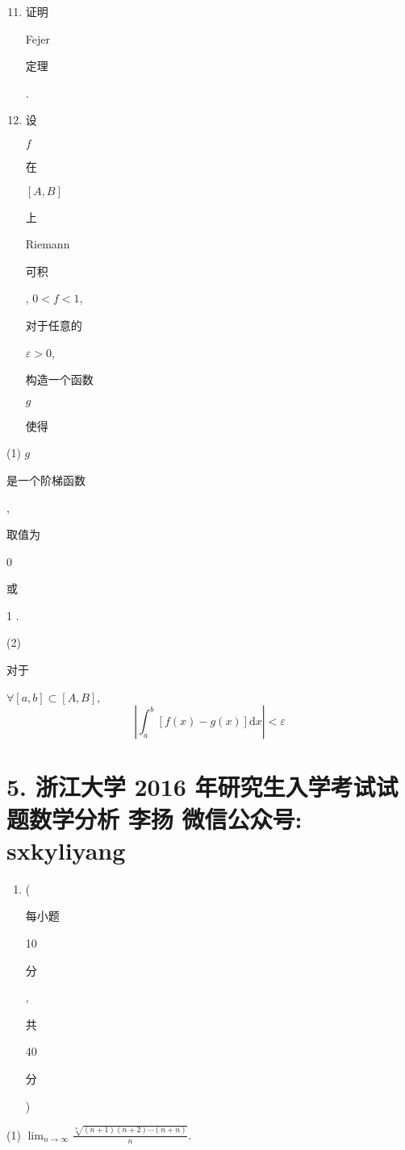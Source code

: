 \documentclass[10pt]{article}
\begin{document}
\begin{enumerate}
  \setcounter{enumi}{10}
  \item \begin{CJK}{UTF8}{mj}证明\end{CJK} Fejer \begin{CJK}{UTF8}{mj}定理\end{CJK}.

  \item \begin{CJK}{UTF8}{mj}设\end{CJK} $f$ \begin{CJK}{UTF8}{mj}在\end{CJK} $[A, B]$ \begin{CJK}{UTF8}{mj}上\end{CJK} Riemann \begin{CJK}{UTF8}{mj}可积\end{CJK}, $0<f<1$, \begin{CJK}{UTF8}{mj}对于任意的\end{CJK} $\varepsilon>0$, \begin{CJK}{UTF8}{mj}构造一个函数\end{CJK} $g$ \begin{CJK}{UTF8}{mj}使得\end{CJK}

\end{enumerate}
(1) $g$ \begin{CJK}{UTF8}{mj}是一个阶梯函数\end{CJK}, \begin{CJK}{UTF8}{mj}取值为\end{CJK} 0 \begin{CJK}{UTF8}{mj}或\end{CJK} 1 .

(2) \begin{CJK}{UTF8}{mj}对于\end{CJK} $\forall[a, b] \subset[A, B]$,
$$
\left|\int_{a}^{b}[f(x)-g(x)] \mathrm{d} x\right|<\varepsilon
$$

\section{5. 浙江大学 2016 年研究生入学考试试题数学分析 
 李扬 
 微信公众号: sxkyliyang}
\begin{enumerate}
  \item (\begin{CJK}{UTF8}{mj}每小题\end{CJK} 10 \begin{CJK}{UTF8}{mj}分\end{CJK}, \begin{CJK}{UTF8}{mj}共\end{CJK} 40 \begin{CJK}{UTF8}{mj}分\end{CJK})
\end{enumerate}
(1) $\lim _{n \rightarrow \infty} \frac{\sqrt[n]{(n+1)(n+2) \cdots(n+n)}}{n}$.
\end{document}
